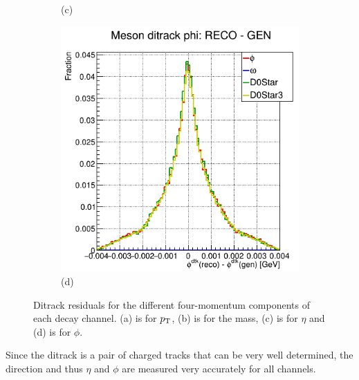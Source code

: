 \begin{myitemlist}
\begin{figure}[!ht]
\begin{subfigure}[t]{0.50\mylength}
                \caption{\footnotesize (c)}
        \end{subfigure}%
        \begin{subfigure}[t]{0.50\mylength}
                \centering
                \includegraphics[width=0.45\mylength]{resources/plots/ditrack_residuals_phi.png}
                \caption{\footnotesize (d)}
        \end{subfigure}%
        \vspace*{-0.0cm}
        \caption{Ditrack residuals for the different four-momentum components of each decay channel. (a) is for $p_\text{T}$, (b) is for the mass, (c) is for $\eta$ and (d) is for $\phi$.}
        \label{fig:ditrack_residuals}
        \vspace*{-0.0cm}
    \end{figure}

    Since the ditrack is a pair of charged tracks that can be very well determined, the direction and thus $\eta$ and $\phi$ are measured very accurately for all channels.


\end{myitemlist}
